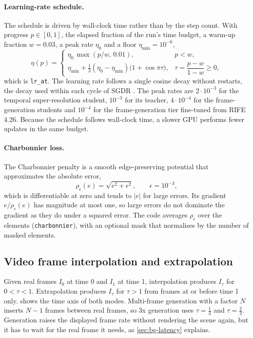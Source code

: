 \paragraph{Learning-rate schedule.} The schedule is driven by wall-clock time rather than by the step count. With progress $p\in[0,1]$, the elapsed fraction of the run's time budget, a warm-up fraction $w=0.03$, a peak rate $\eta_0$ and a floor $\eta_{\min}=10^{-6}$,
\begin{equation}
\eta(p)=\begin{cases}\eta_0\,\max(p/w,\,0.01), & p<w,\\[2pt] \eta_{\min}+\tfrac12(\eta_0-\eta_{\min})\big(1+\cos\pi\tau\big), & \tau=\dfrac{p-w}{1-w}\ge0,\end{cases}\label{eq:bg-cosine}
\end{equation}
which is \texttt{lr\_at}. The learning rate follows a single cosine decay without restarts, the decay used within each cycle of SGDR \cite{loshchilov2017sgdr}. The peak rates are $2\cdot10^{-3}$ for the temporal super-resolution student, $10^{-3}$ for its teacher, $4\cdot10^{-4}$ for the frame-generation students and $10^{-4}$ for the frame-generation tier fine-tuned from RIFE 4.26. Because the schedule follows wall-clock time, a slower GPU performs fewer updates in the same budget.

\paragraph{Charbonnier loss.} The Charbonnier penalty \cite{charbonnier1997deterministic} is a smooth edge-preserving potential that approximates the absolute error,
\begin{equation}
\rho_\epsilon(e)=\sqrt{e^2+\epsilon^2},\qquad \epsilon=10^{-3},\label{eq:bg-charb}
\end{equation}
which is differentiable at zero and tends to $|e|$ for large errors. Its gradient $e/\rho_\epsilon(e)$ has magnitude at most one, so large errors do not dominate the gradient as they do under a squared error. The code averages $\rho_\epsilon$ over the elements (\texttt{charbonnier}), with an optional mask that normalises by the number of masked elements.

\subsection{Video frame interpolation and extrapolation}\label{sec:bg-interp}

Given real frames $I_0$ at time 0 and $I_1$ at time 1, interpolation produces $I_\tau$ for $0<\tau<1$. Extrapolation produces $I_\tau$ for $\tau>1$ from frames at or before time 1 only.  shows the time axis of both modes. Multi-frame generation with a factor $N$ inserts $N-1$ frames between real frames, so 3x generation uses $\tau=\tfrac13$ and $\tau=\tfrac23$. Generation raises the displayed frame rate without rendering the scene again, but it has to wait for the real frame it needs, as \cref{sec:bg-latency} explains.

